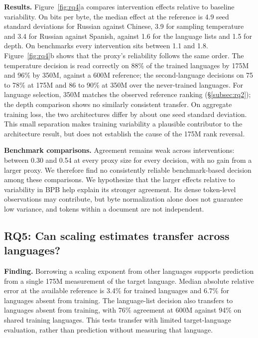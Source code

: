 \textbf{Results.} Figure~\ref{fig:rq4}a compares intervention effects relative to baseline variability. On bits per byte, the median effect at the reference is 4.9 seed standard deviations for Russian against Chinese, 3.9 for sampling temperature and 3.4 for Russian against Spanish, against 1.6 for the language lists and 1.5 for depth. On benchmarks every intervention sits between 1.1 and 1.8. Figure~\ref{fig:rq4}b shows that the proxy's reliability follows the same order. The temperature decision is read correctly on 88\% of the trained languages by 175M and 96\% by 350M, against a 600M reference; the second-language decisions on 75 to 78\% at 175M and 86 to 90\% at 350M over the never-trained languages. For language selection, 350M matches the observed reference ranking (\S\ref{subsec:rq2}); the depth comparison shows no similarly consistent transfer. On aggregate training loss, the two architectures differ by about one seed standard deviation. This small separation makes training variability a plausible contributor to the architecture result, but does not establish the cause of the 175M rank reversal.

\textbf{Benchmark comparisons.} Agreement remains weak across interventions: between 0.30 and 0.54 at every proxy size for every decision, with no gain from a larger proxy. We therefore find no consistently reliable benchmark-based decision among these comparisons. We hypothesize that the larger effects relative to variability in BPB help explain its stronger agreement. Its dense token-level observations may contribute, but byte normalization alone does not guarantee low variance, and tokens within a document are not independent.

\subsection{RQ5: Can scaling estimates transfer across languages?}
\label{subsec:rq5}

\textbf{Finding.} Borrowing a scaling exponent from other languages supports prediction from a single 175M measurement of the target language. Median absolute relative error at the available reference is 3.4\% for trained languages and 6.7\% for languages absent from training. The language-list decision also transfers to languages absent from training, with 76\% agreement at 600M against 94\% on shared training languages. This tests transfer with limited target-language evaluation, rather than prediction without measuring that language.

